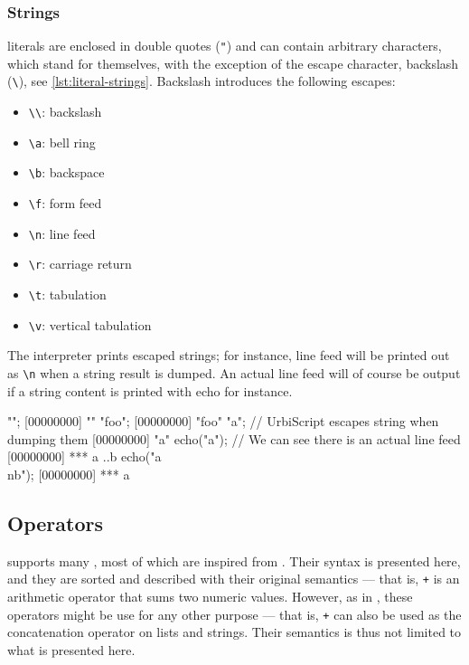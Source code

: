 \subsubsection{Strings}

 literals are enclosed in double quotes (\lstinline|"|)
and can contain arbitrary characters, which stand for themselves, with
the exception of the escape character, backslash (\lstinline|\|), see
\autoref{lst:literal-strings}. Backslash introduces the following
escapes:

\begin{itemize}
  \item \lstinline |\\|: backslash
  \item \lstinline|\a|: bell ring
  \item \lstinline|\b|: backspace
  \item \lstinline|\f|: form feed
  \item \lstinline|\n|: line feed
  \item \lstinline|\r|: carriage return
  \item \lstinline|\t|: tabulation
  \item \lstinline|\v|: vertical tabulation
\end{itemize}

The interpreter prints escaped strings; for instance, line feed
will be printed out as \lstinline|\n| when a string result is
dumped. An actual line feed will of course be output if a string
content is printed with echo for instance.

\begin{urbiscript}[caption=Literal strings,label=lst:literal-strings,float=\floatpos]
"";
[00000000] ""
"foo";
[00000000] "foo"
"a\nb"; // UrbiScript escapes string when dumping them
[00000000] "a\nb"
echo("a\nb"); // We can see there is an actual line feed
[00000000] *** a
..b
echo("a\\nb");
[00000000] *** a\nb
\end{urbiscript}

\subsection{Operators}

\us supports many , most of which are inspired from
\Cxx. Their syntax is presented here, and they are sorted and
described with their original semantics --- that is, \lstinline|+| is
an arithmetic operator that sums two numeric values. However, as in
\Cxx, these operators might be use for any other purpose --- that is,
\lstinline|+| can also be used as the concatenation operator on lists
and strings. Their semantics is thus not limited to what is presented
here.

